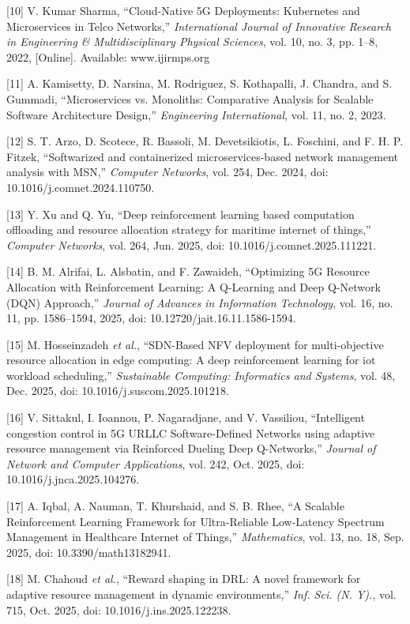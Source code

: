 {[}10{]} V. Kumar Sharma, ``Cloud-Native 5G Deployments: Kubernetes and Microservices in Telco Networks,'' \emph{International Journal of Innovative Research in Engineering \& Multidisciplinary Physical Sciences}, vol. 10, no. 3, pp. 1--8, 2022, {[}Online{]}. Available: www.ijirmps.org

{[}11{]} A. Kamisetty, D. Narsina, M. Rodriguez, S. Kothapalli, J. Chandra, and S. Gummadi, ``Microservices vs. Monoliths: Comparative Analysis for Scalable Software Architecture Design,'' \emph{Engineering International}, vol. 11, no. 2, 2023.

{[}12{]} S. T. Arzo, D. Scotece, R. Bassoli, M. Devetsikiotis, L. Foschini, and F. H. P. Fitzek, ``Softwarized and containerized microservices-based network management analysis with MSN,'' \emph{Computer Networks}, vol. 254, Dec. 2024, doi: 10.1016/j.comnet.2024.110750.

{[}13{]} Y. Xu and Q. Yu, ``Deep reinforcement learning based computation offloading and resource allocation strategy for maritime internet of things,'' \emph{Computer Networks}, vol. 264, Jun. 2025, doi: 10.1016/j.comnet.2025.111221.

{[}14{]} B. M. Alrifai, L. Alsbatin, and F. Zawaideh, ``Optimizing 5G Resource Allocation with Reinforcement Learning: A Q-Learning and Deep Q-Network (DQN) Approach,'' \emph{Journal of Advances in Information Technology}, vol. 16, no. 11, pp. 1586--1594, 2025, doi: 10.12720/jait.16.11.1586-1594.

{[}15{]} M. Hosseinzadeh \emph{et al.}, ``SDN-Based NFV deployment for multi-objective resource allocation in edge computing: A deep reinforcement learning for iot workload scheduling,'' \emph{Sustainable Computing: Informatics and Systems}, vol. 48, Dec. 2025, doi: 10.1016/j.suscom.2025.101218.

{[}16{]} V. Sittakul, I. Ioannou, P. Nagaradjane, and V. Vassiliou, ``Intelligent congestion control in 5G URLLC Software-Defined Networks using adaptive resource management via Reinforced Dueling Deep Q-Networks,'' \emph{Journal of Network and Computer Applications}, vol. 242, Oct. 2025, doi: 10.1016/j.jnca.2025.104276.

{[}17{]} A. Iqbal, A. Nauman, T. Khurshaid, and S. B. Rhee, ``A Scalable Reinforcement Learning Framework for Ultra-Reliable Low-Latency Spectrum Management in Healthcare Internet of Things,'' \emph{Mathematics}, vol. 13, no. 18, Sep. 2025, doi: 10.3390/math13182941.

{[}18{]} M. Chahoud \emph{et al.}, ``Reward shaping in DRL: A novel framework for adaptive resource management in dynamic environments,'' \emph{Inf. Sci. (N. Y).}, vol. 715, Oct. 2025, doi: 10.1016/j.ins.2025.122238.


